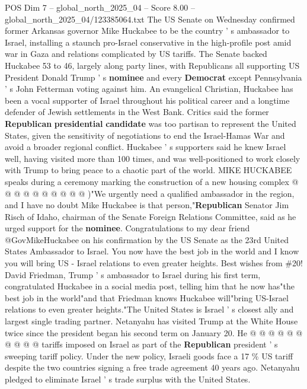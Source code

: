 \begin{textsample}{POS Dim 7 – global\_north\_2025\_04 – Score 8.00 – global\_north\_2025\_04/123385064.txt}  \label{ex:f7_pos_360}
The US Senate on Wednesday confirmed former Arkansas governor Mike Huckabee to be the country ' s ambassador to Israel, installing a staunch pro-Israel conservative in the high-profile post amid war in Gaza and relations complicated by US tariffs.
The Senate backed Huckabee 53 to 46, largely along party lines, with Republicans all supporting US President Donald Trump ' s \textbf{nominee} and every \textbf{Democrat} except Pennsylvania ' s John Fetterman voting against him.
An evangelical Christian, Huckabee has been a vocal supporter of Israel throughout his political career and a longtime defender of Jewish settlements in the West Bank.
Critics said the former \textbf{Republican} \textbf{presidential} \textbf{candidate} was too partisan to represent the United States, given the sensitivity of negotiations to end the Israel-Hamas War and avoid a broader regional conflict.
Huckabee ' s supporters said he knew Israel well, having visited more than 100 times, and was well-positioned to work closely with Trump to bring peace to a chaotic part of the world.
MIKE HUCKABEE speaks during a ceremony marking the construction of a new housing complex @ @ @ @ @ @ @ @ @ @ )"We urgently need a qualified ambassador in the region, and I have no doubt Mike Huckabee is that person,"\textbf{Republican} Senator Jim Risch of Idaho, chairman of the Senate Foreign Relations Committee, said as he urged support for the \textbf{nominee}.
Congratulations to my dear friend @GovMikeHuckabee on his confirmation by the US Senate as the 23rd United States Ambassador to Israel.
You now have the best job in the world and I know you will bring US - Israel relations to even greater heights.
Best wishes from \#20!
David Friedman, Trump ' s ambassador to Israel during his first term, congratulated Huckabee in a social media post, telling him that he now has"the best job in the world"and that Friedman knows Huckabee will"bring US-Israel relations to even greater heights."The United States is Israel ' s closest ally and largest single trading partner.
Netanyahu has visited Trump at the White House twice since the president began his second term on January 20.
He @ @ @ @ @ @ @ @ @ @ tariffs imposed on Israel as part of the \textbf{Republican} president ' s sweeping tariff policy.
Under the new policy, Israeli goods face a 17 \% US tariff despite the two countries signing a free trade agreement 40 years ago.
Netanyahu pledged to eliminate Israel ' s trade surplus with the United States.

\end{textsample}

